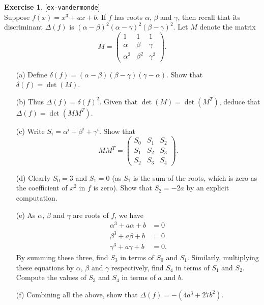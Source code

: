 \documentclass{amsart}
\newcommand{\al}        {\alpha}
\newcommand{\bt}        {\beta}
\newcommand{\gm}        {\gamma}
\newcommand{\dl}        {\delta}
\newcommand{\Dl}        {\Delta}
\renewcommand{\:}{\colon}
\newcommand{\lastexlabel}{}
\newcommand{\exlabel}[1]{
 \global\def\lastexlabel{#1}\label{#1}[\texttt{#1}]\ \\
}
\newcommand{\exlabel}[1]{
 \global\def\lastexlabel{#1}\label{#1}
}
\theoremstyle{definition}
\newtheorem{exercise}{Exercise}[section]
\begin{document}
\begin{exercise}\exlabel{ex-vandermonde}
 Suppose $f(x)=x^3+ax+b$. If $f$ has roots $\al$, $\bt$ and
 $\gm$, then recall that its discriminant $\Dl(f)$ is
 $(\al-\bt)^2(\al-\gm)^2(\bt-\gm)^2$.  Let $M$ denote
 the matrix
 \[ M=
     \begin{pmatrix}
      1&1&1\\
      \al&\bt&\gm\\
      \al^2&\bt^2&\gm^2
     \end{pmatrix}.
 \]
 \begin{itemize}
  \item[(a)] Define $\dl(f)=(\al-\bt)(\bt-\gm)(\gm-\al)$. Show that
   $\dl(f)=\det(M)$.
  \item[(b)] Thus $\Dl(f)=\dl(f)^2$.  Given that $\det(M)=\det(M^T)$,
   deduce that $\Dl(f)=\det(MM^T)$.
  \item[(c)] Write $S_i=\al^i+\bt^i+\gm^i$. Show that
   \[ MM^T =
        \begin{pmatrix}
         S_0&S_1&S_2\\
         S_1&S_2&S_3\\
         S_2&S_3&S_4
        \end{pmatrix}.
   \]
  \item[(d)] Clearly $S_0=3$ and $S_1=0$ (as $S_1$ is the sum of the
   roots, which is zero as the coefficient of $x^2$ in $f$ is
   zero). Show that $S_2=-2a$ by an explicit computation. 
  \item[(e)] As $\al$, $\bt$ and $\gm$ are roots of $f$, we have
   \begin{align*}
    \al^3+a\al+b &= 0\\
    \bt^3+a\bt+b &= 0\\
    \gm^3+a\gm+b &= 0.
   \end{align*}
   By summing these three, find $S_3$ in terms of $S_0$ and
   $S_1$.  Similarly, multiplying these equations by $\al$, $\bt$ and
   $\gm$ respectively, find $S_4$ in terms of $S_1$ and $S_2$. Compute
   the values of $S_3$ and $S_4$ in terms of $a$ and $b$.
  \item[(f)] Combining all the above, show that $\Dl(f)=-(4a^3+27b^2)$.
 \end{itemize}
\end{exercise}
\end{document}

